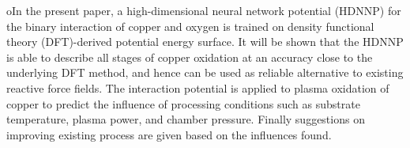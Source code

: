 \documentclass[manuscript=cmatex]{achemso}
\begin{document}






oIn the present paper, a high-dimensional neural network potential (HDNNP) for the binary interaction of copper and oxygen is trained on density functional theory (DFT)-derived potential energy surface. It will be shown that the HDNNP is able to describe all stages of copper oxidation at an accuracy close to the underlying DFT method, and hence can be used as reliable alternative to existing reactive force fields. The interaction potential is applied to plasma oxidation of copper to predict the influence of processing conditions such as substrate temperature, plasma power, and chamber pressure. Finally suggestions on improving existing process are given based on the influences found.
\end{document}
